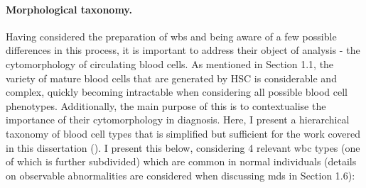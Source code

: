 \begin{figure}[!ht]
	\label{fig:whole-blood-slide}
\end{figure}

\paragraph{Morphological taxonomy.} Having considered the preparation of \ac{wbs} and being aware of a few possible differences in this process, it is important to address their object of analysis - the cytomorphology of circulating blood cells. As mentioned in Section 1.1, the variety of mature blood cells that are generated by HSC is considerable and complex, quickly becoming intractable when considering all possible blood cell phenotypes. Additionally, the main purpose of this is to contextualise the importance of their cytomorphology in diagnosis. Here, I present a hierarchical taxonomy of blood cell types that is simplified but sufficient for the work covered in this dissertation (). I present this below, considering 4 relevant \ac{wbc} types (one of which is further subdivided) which are common in normal individuals (details on observable abnormalities are considered when discussing \ac{mds} in Section 1.6):
